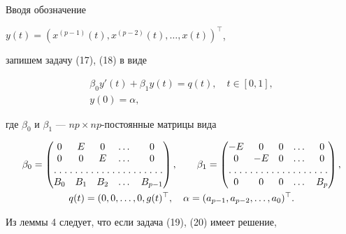 Вводя обозначение 


$y(t)=(x^{(p-1)}(t),x^{(p-2)}(t),\dotsc,x(t))^\top$, 


запишем задачу (17), (18) в виде 


\begin{gather} 


\beta_0y'(t)+\beta_1y(t)=q(t),\quad t\in[0,1],\\ 


y(0)=\alpha, 


\end{gather} 


где $\beta_0$ и $\beta_1$ --- $np\times np$-постоянные матрицы вида 


\begin{gather*} 


\beta_0= 


\begin{pmatrix} 


0 & E & 0 & \dots & 0 \\ 


0 & 0 & E & \dots & 0 \\ 


\hdotsfor[1.5]{5}\\ 


B_0 & B_1 & B_2 & \dots & B_{p-1} 


\end{pmatrix} 


,\qquad \beta_1= 


\begin{pmatrix} 


-E & 0 & 0 & \dots & 0 \\ 


0 & -E & 0 & \dots & 0 \\ 


\hdotsfor[1.5]{5}\\ 


0 & 0 & 0 & \dots & B_p 


\end{pmatrix} 


,\\ 


q(t)=(0,0,\dotsc,0,g(t)^\top,\quad 


\alpha=(a_{p-1},a_{p-2},\dotsc,a_0)^\top. 


\end{gather*} 


 


Из леммы 4 следует, что если задача (19), (20) имеет решение, 


